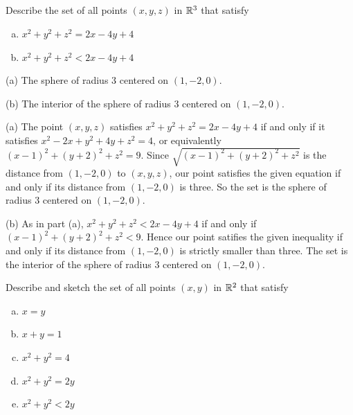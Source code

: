 


\subsection*{\Conceptual}


\begin{question}
 Describe the set of all points $(x,y,z)$ 
in $\mathbb{R}^3$ that satisfy
\begin{enumerate}[(a)] 
\item
          $x^2 +y^2+z^2= 2x-4y+4$
\item
          $x^2 +y^2+z^2< 2x-4y+4$
\end{enumerate}
\end{question}

%

\begin{answer}
(a) The sphere of radius 3 centered on $(1,-2,0)$.

(b) The interior of the sphere of radius 3 centered on $(1,-2,0)$.

\end{answer}

\begin{solution}
(a) The point $(x,y,z)$ satisfies $x^2 +y^2+z^2= 2x-4y+4$
if and only if it satisfies $x^2-2x +y^2+4y+z^2= 4$, or equivalently 
$(x-1)^2 +(y+2)^2+z^2=9 $. Since $\sqrt{(x-1)^2 +(y+2)^2+z^2}$ is the distance
from $(1, -2, 0)$ to $(x,y,z)$, our point satisfies the given equation
if and only if its distance from $(1,-2,0)$ is three. So the set is
the sphere of radius 3 centered on $(1,-2,0)$.

(b)
As in part (a), $x^2 +y^2+z^2< 2x-4y+4$
if and only if  $(x-1)^2 +(y+2)^2+z^2<9 $. Hence our point 
satifies the given inequality
if and only if its distance from $(1,-2,0)$ is strictly smaller than three. 
The set is the interior of the sphere of radius 3 centered on $(1,-2,0)$.

\end{solution}

\begin{question}
Describe and sketch the set of all points $(x,y)$ 
in $\mathbb{R}^2$ that satisfy
\begin{enumerate}[(a)]
\item
$x=y$
\item
$x+y=1$
\item
$x^2+y^2=4$
\item
$x^2+y^2=2y$
\item
$x^2+y^2<2y$
\end{enumerate}
\end{question}

